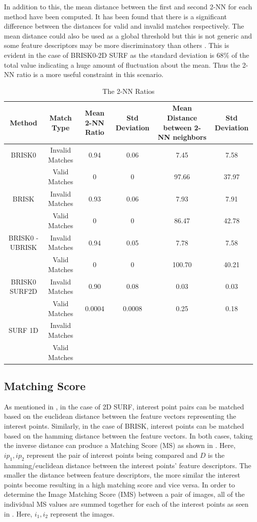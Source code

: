 \documentclass{report}
\begin{document}
In addition to this, the mean distance between the first and second 2-NN for each method have been computed. It has been found that there is a significant difference between the distances for valid and invalid matches respectively. The mean distance could also be used as a global threshold but this is not generic and some feature descriptors may be more discriminatory than others \cite{Lowe2004}. This is evident in the case of BRISK0-2D SURF as the standard deviation is $68\%$ of the total value indicating a huge amount of fluctuation about the mean. Thus the 2-NN ratio is a more useful constraint in this scenario.\\

\begin{table}
\caption{The 2-NN Ratios}
\footnotesize
\begin{tabular}{|c|c|c|c|c|c|}
\hline 
Method & Match Type & Mean 2-NN Ratio & Std Deviation & Mean Distance between 2-NN neighbors & Std Deviation\tabularnewline
\hline 
\hline 
BRISK0 & Invalid Matches & 0.94 & 0.06 & 7.45 & 7.58\tabularnewline
\hline 
 & Valid Matches & 0 & 0 & 97.66 & 37.97\tabularnewline
\hline 
BRISK & Invalid Matches & 0.93 & 0.06 & 7.93 & 7.91\tabularnewline
\hline 
 & Valid Matches & 0 & 0 & 86.47 & 42.78\tabularnewline
\hline 
BRISK0 - UBRISK & Invalid Matches & 0.94 & 0.05 & 7.78 & 7.58\tabularnewline
\hline 
 & Valid Matches & 0 & 0 & 100.70 & 40.21\tabularnewline
\hline 
BRISK0 SURF2D & Invalid Matches & 0.90 & 0.08 & 0.03 & 0.03\tabularnewline
\hline 
 & Valid Matches & 0.0004 & 0.0008 & 0.25 & 0.18\tabularnewline
\hline 
SURF 1D & Invalid Matches &  &  &  & \tabularnewline
\hline 
 & Valid Matches &  &  &  & \tabularnewline
\hline 
\end{tabular}
\label{tab:knnCriterion}
\end{table}

\subsection{Matching Score}
\label{sec:matchingScore}
As mentioned in , in the case of 2D SURF, interest point pairs can be matched based on the euclidean distance between the feature vectors representing the interest points. Similarly, in the case of BRISK, interest points can be matched based on the hamming distance between the feature vectors. In both cases, taking the inverse distance can produce a Matching Score (MS) as shown in . Here, $ip_1, ip_2$ represent the pair of interest points being compared and $D$ is the hamming/euclidean distance between the interest points' feature descriptors. The smaller the distance between feature descriptors, the more similar the interest points become resulting in a high matching score and vice versa. In order to determine the Image Matching Score (IMS) between a pair of images, all of the individual MS values are summed together for each of the interest points as seen in . Here, $i_1, i_2$ represent the images. \\
\end{document}
